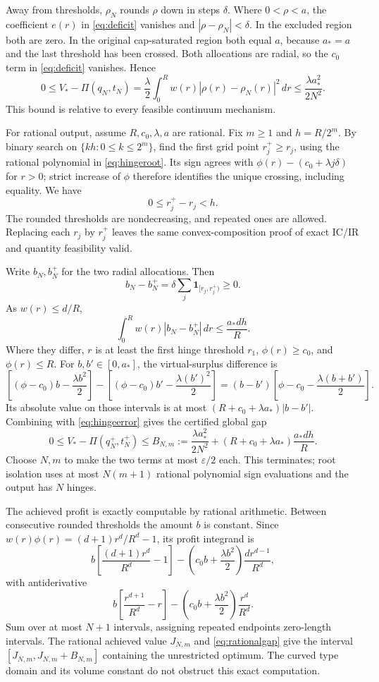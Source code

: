 \documentclass[11pt,a4paper]{article}
\numberwithin{equation}{section}
\newcommand{\ind}{\mathbf1}
\begin{document}
Away from thresholds, \(\rho_N\) rounds \(\rho\) down in steps \(\delta\).
Where \(0<\rho<a\), the coefficient \(e(r)\) in \eqref{eq:deficit}
vanishes and \(|\rho-\rho_N|<\delta\).
In the excluded region both are zero.
In the original cap-saturated region both equal \(a\), because
\(a_*=a\) and the last threshold has been crossed.
Both allocations are radial, so the \(c_0\) term in \eqref{eq:deficit}
vanishes. Hence
\begin{equation}\label{eq:hingeerror}
 0\le V_*-\Pi(q_N,t_N)
 =\frac{\lambda}{2}\int_0^Rw(r)|\rho(r)-\rho_N(r)|^2\,dr
 \le\frac{\lambda a_*^2}{2N^2}.
\end{equation}
This bound is relative to every feasible continuum mechanism.

For rational output, assume \(R,c_0,\lambda,a\) are rational.
Fix \(m\ge1\) and \(h=R/2^m\).
By binary search on \(\{kh:0\le k\le2^m\}\), find the first grid
point \(r_j^+\ge r_j\), using the rational polynomial in
\eqref{eq:hingeroot}.
Its sign agrees with \(\phi(r)-(c_0+\lambda j\delta)\) for \(r>0\);
strict increase of \(\phi\) therefore identifies the unique crossing,
including equality. We have
\[
 0\le r_j^+-r_j<h.
\]
The rounded thresholds are nondecreasing, and repeated ones are allowed.
Replacing each \(r_j\) by \(r_j^+\) leaves the same convex-composition
proof of exact IC/IR and quantity feasibility valid.

Write \(b_N,b_N^+\) for the two radial allocations. Then
\[
 b_N-b_N^+=\delta\sum_j\ind_{[r_j,r_j^+)}\ge0.
\]
As \(w(r)\le d/R\),
\[
 \int_0^Rw(r)|b_N-b_N^+|\,dr\le\frac{a_*dh}{R}.
\]
Where they differ, \(r\) is at least the first hinge threshold \(r_1\),
\(\phi(r)\ge c_0\), and
\(\phi(r)\le R\).
For \(b,b'\in[0,a_*]\), the virtual-surplus difference is
\[
 \left[(\phi-c_0)b-\frac{\lambda b^2}{2}\right]
 -\left[(\phi-c_0)b'-\frac{\lambda(b')^2}{2}\right]
 =(b-b')\left[\phi-c_0-\frac{\lambda(b+b')}{2}\right].
\]
Its absolute value on those intervals is at most
\((R+c_0+\lambda a_*)|b-b'|\).
Combining with \eqref{eq:hingeerror} gives the certified global gap
\begin{equation}\label{eq:rationalgap}
 0\le V_*-\Pi(q_N^+,t_N^+)
 \le B_{N,m}:=\frac{\lambda a_*^2}{2N^2}
       +(R+c_0+\lambda a_*)\frac{a_*dh}{R}.
\end{equation}
Choose \(N,m\) to make the two terms at most \(\varepsilon/2\)
each. This terminates; root isolation uses at most \(N(m+1)\)
rational polynomial sign evaluations and the output has \(N\) hinges.

The achieved profit is exactly computable by rational arithmetic.
Between consecutive rounded thresholds the amount \(b\) is constant.
Since \(w(r)\phi(r)=(d+1)r^d/R^d-1\), its profit integrand is
\[
 b\left[\frac{(d+1)r^d}{R^d}-1\right]
 -\left(c_0b+\frac{\lambda b^2}{2}\right)\frac{dr^{d-1}}{R^d},
\]
with antiderivative
\[
 b\left[\frac{r^{d+1}}{R^d}-r\right]
 -\left(c_0b+\frac{\lambda b^2}{2}\right)\frac{r^d}{R^d}.
\]
Sum over at most \(N+1\) intervals, assigning repeated endpoints
zero-length intervals.
The rational achieved value \(J_{N,m}\) and \eqref{eq:rationalgap}
give the interval \([J_{N,m},J_{N,m}+B_{N,m}]\) containing the
unrestricted optimum. The curved type domain and its volume constant
do not obstruct this exact computation.
\end{document}
